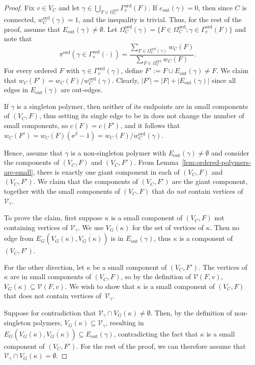 \documentclass[11pt]{article}
\theoremstyle{plain}
\newcommand{\emm}{\mathrm{e}}
\newcommand{\V}{\mathcal{V}}
\newcommand{\Vin}{\V_\gamma}
\newcommand{\out}{\mathrm{out}}
\newcommand{\1}{\mathbb{1}}
\newcommand{\ord}{\mathrm{ord}}
\begin{document}
\begin{proof}
    Fix \(v\in V_C\) and let \(\gamma\in\bigcup_{F\in\Omega_C^\ord} \Gamma_v^\ord(F)\).
    If \(e_\out(\gamma) = 0\), then since \(C\) is connected, \(w^\ord_C(\gamma) = 1\), and the inequality is trivial. Thus, for the rest of the proof, assume that \(E_\out(\gamma)\neq \emptyset\). Let $\Omega_C^{\ord}(\gamma)=\{F\in\Omega^\ord_C; \gamma\in\Gamma_v^\ord(F)\}$ and note that
    \[  \pi^\ord(\gamma\in\Gamma_v^\ord(\cdot)) = \frac{\sum_{F\in \Omega_C^{\ord}(\gamma)} w_C(F)}{\sum_{F\in\Omega^\ord_C} w_C(F)}.
    \]
    For every ordered \(F\) with \(\gamma\in\Gamma_v^\ord(\gamma)\), define \(F' := F\cup E_\out(\gamma) \neq F\). We claim that \(w_C(F') = w_C(F) / w_C^\ord(\gamma)\).
Clearly, \(|F'|=|F|+|E_\out(\gamma)|\) since all edges in \(E_\out(\gamma)\) are out-edges. 

If \(\gamma\) is a singleton polymer, then neither of its endpoints are in small components of \((V_C,F)\), thus setting its single edge to be in does not change the number of small components, so \(c(F) = c(F')\), and it follows that \(w_C(F') = w_C(F) (\emm^\beta-1) = w_C(F)/w_C^\ord(\gamma)\).
 
    
Hence, assume that \(\gamma\) is a non-singleton polymer 
with $E_\out(\gamma) \neq \emptyset$ 
and consider the components of \((V_C,F)\) and \((V_C,F')\). 
From Lemma~\ref{lem:ordered-polymers-are-small}, there is exactly one giant component in each of \((V_C,F)\) and \((V_C,F')\).
We claim that the components of \((V_C,F')\) are the giant component, 
together with
the small components of \((V_C,F)\) that do \textit{not} contain vertices of \(\Vin\).  

To prove the claim,
first suppose \(\kappa\) is a small component of \((V_C,F)\) not containing vertices of \(\Vin\). We use \(V_G(\kappa)\) for the set of vertices of \(\kappa\). Then  no edge from \(E_G(V_G(\kappa), \overline{V_G(\kappa)})\) is in \(E_\out(\gamma)\), thus  $\kappa$ is a component of \((V_C,F')\).

For the other direction, let \(\kappa\) be a small component of \((V_C,F')\). 
The vertices of $\kappa$ are in small components of $(V_C,F)$, so  by the definition of $\V(F,v)$,
$V_G(\kappa) \subseteq \V(F,v)$. 
We wish to show that $\kappa$ is a small component of $(V_C,F)$ that does not contain vertices of~$\Vin$.

Suppose for contradiction that
\(\Vin\cap V_G(\kappa)\neq \emptyset\). Then, by the definition of non-singleton polymers, \(V_G(\kappa)\subseteq \Vin\), resulting in \(E_G(V_G(\kappa),\overline{V_G(\kappa)})\subseteq E_\out(\gamma)\), contradicting the fact that \(\kappa\) is a  small component of \((V_C,F')\).  
For the rest of the proof, we can therefore assume that \(\Vin\cap V_G(\kappa) = \emptyset\).



\end{proof}
\end{document}
